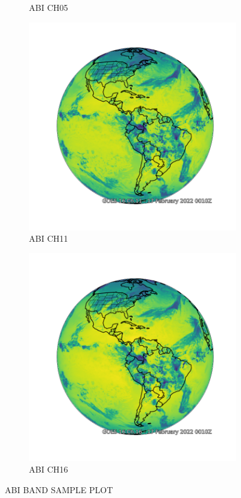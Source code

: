 \begin{figure}[h!]
\begin{subfigure}[b]{0.4\linewidth}
    \caption{ABI CH05}
  \end{subfigure}
  \begin{subfigure}[b]{0.4\linewidth}
    \includegraphics[width=\linewidth]{goes_fulldisk_C11.png}
    \caption{ABI CH11}
  \end{subfigure}
  \begin{subfigure}[b]{0.4\linewidth}
    \includegraphics[width=\linewidth]{goes_fulldisk_C16.png}
    \caption{ABI CH16}
  \end{subfigure}
  \caption{ABI BAND SAMPLE PLOT}
  \label{ABI BAND SAMPLE PLOT}
\end{figure}



